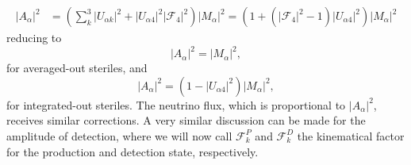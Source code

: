 %
\begin{align}
\left| A_{\alpha} \right|^2 &= \left( \sum_k^3 \left| U_{\alpha k} \right|^2 + |U_{\alpha 4}|^2 \left| \mathcal{F}_4 \right|^2 \right)\left| M_{\alpha} \right|^2  = \left( 1 + \left( |\mathcal{F}_4|^2 - 1 \right) |U_{\alpha 4}|^2 \right) \left| M_{\alpha} \right|^2  
\end{align}     
reducing to
\begin{equation}
|A_{\alpha}|^2 = |M_{\alpha}|^2,
\end{equation}
for averaged-out steriles, and
\begin{equation}
|A_{\alpha}|^2 = \left( 1 - |U_{\alpha 4}|^2 \right)|M_{\alpha}|^2,
\end{equation}
for integrated-out steriles. The neutrino flux, which is proportional to $|A_{\alpha}|^2$, receives similar corrections. A very similar discussion can be made for the amplitude of detection, where we will now call $\mathcal{F}^P_k$ and $\mathcal{F}^D_k$ the kinematical factor for the production and detection state, respectively.

